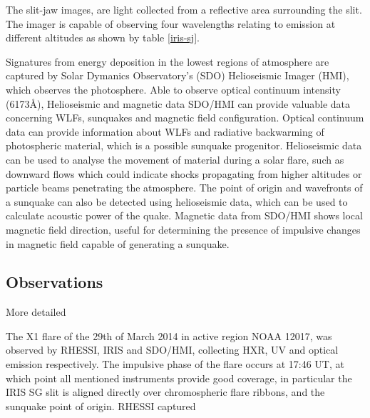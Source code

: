 The slit-jaw images, are light collected from a reflective area surrounding the slit. The imager is capable of observing four wavelengths relating to emission at different altitudes as shown by table \ref{iris-sj}. 


  

Signatures from energy deposition in the lowest regions of atmosphere are captured by Solar Dymanics Observatory's (SDO) Helioseismic Imager (HMI), which observes the photosphere. Able to observe optical continuum intensity (6173Å), Helioseismic and magnetic data SDO/HMI can provide valuable data concerning WLFs, sunquakes and magnetic field configuration. Optical continuum data can provide information about WLFs and radiative backwarming of photospheric material, which is a possible sunquake progenitor. Helioseismic data can be used to analyse the movement of material during a solar flare, such as downward flows which could indicate shocks propagating from higher altitudes or particle beams penetrating the atmosphere. The point of origin and wavefronts of a sunquake can also be detected using helioseismic data, which can be used to calculate acoustic power of the quake. Magnetic data from SDO/HMI shows local magnetic field direction, useful for determining the presence of impulsive changes in magnetic field capable of generating a sunquake.     







\subsection{Observations}
More detailed




The X1 flare of the 29th of March 2014 in active region NOAA 12017, was observed by RHESSI, IRIS and SDO/HMI, collecting HXR, UV and optical emission respectively. The impulsive phase of the flare occurs at 17:46 UT, at which point all mentioned instruments provide good coverage, in particular the IRIS SG slit is aligned directly over chromospheric flare ribbons, and the sunquake point of origin.
RHESSI captured  


